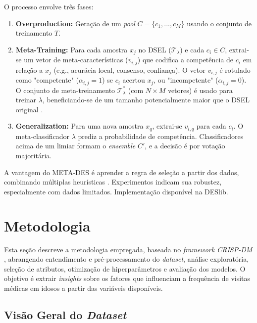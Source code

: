\documentclass[12pt]{article}
\begin{document}
O processo envolve três fases:
\begin{enumerate}
    \item \textbf{Overproduction:} Geração de um \textit{pool} $C = \{c_1, ..., c_M\}$ usando o conjunto de treinamento $T$.
    
    \item \textbf{Meta-Training:} Para cada amostra $x_j$ no DSEL ($\mathcal{T}_{\lambda}$) e cada $c_i \in C$, extrai-se um vetor de meta-características ($v_{i,j}$) que codifica a competência de $c_i$ em relação a $x_j$ (e.g., acurácia local, consenso, confiança). O vetor $v_{i,j}$ é rotulado como "competente" ($\alpha_{i,j}=1$) se $c_i$ acertou $x_j$, ou "incompetente" ($\alpha_{i,j}=0$). O conjunto de meta-treinamento $\mathcal{T}_{\lambda}^*$ (com $N \times M$ vetores) é usado para treinar $\lambda$, beneficiando-se de um tamanho potencialmente maior que o DSEL original \cite{Cruz_2015}.
    
    \item \textbf{Generalization:} Para uma nova amostra $x_q$, extrai-se $v_{i,q}$ para cada $c_i$. O meta-classificador $\lambda$ prediz a probabilidade de competência. Classificadores acima de um limiar formam o \textit{ensemble} $C'$, e a decisão é por votação majoritária.
\end{enumerate}

A vantagem do META-DES é aprender a regra de seleção a partir dos dados, combinando múltiplas heurísticas \cite{Cruz_2015}. Experimentos indicam sua robustez, especialmente com dados limitados. Implementação disponível na DESlib.

\section{Metodologia}

Esta seção descreve a metodologia empregada, baseada no \textit{framework CRISP-DM} \cite{crisp-dm}, abrangendo entendimento e pré-processamento do \textit{dataset}, análise exploratória, seleção de atributos, otimização de hiperparâmetros e avaliação dos modelos. O objetivo é extrair \textit{insights} sobre os fatores que influenciam a frequência de visitas médicas em idosos a partir das variáveis disponíveis.

\subsection{Visão Geral do \textit{Dataset}} 
\end{document}
